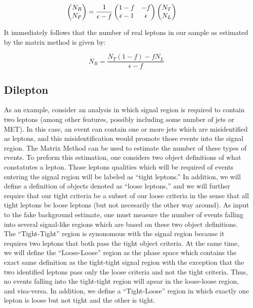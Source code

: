 \begin{equation}
  \label{eqn:single_lepton_matrix_standard_inverted}
  \hspace{-0.5cm}
  \begin{pmatrix}
    N_{R}\\
    N_{F} \\
  \end{pmatrix} 
  = \frac{1}{\epsilon - f}
  \begin{pmatrix}
    1-f & -f \\
    \epsilon-1 & \epsilon \\
  \end{pmatrix}
  \begin{pmatrix}
    N_{T} \\
    N_{L} \\
  \end{pmatrix}
\end{equation}

It immediately follows that the number of real leptons in our sample as estimated by the matrix method is given by:

\begin{equation}
  \label{eqn:single_lepton_matrix_standard_num_real}
  N_{R} = \frac{N_T(1-f) - f N_L}{\epsilon - f}
\end{equation}


\subsection{Dilepton}

As an example, consider an analysis in which signal region is required to contain two leptons (among other features, possibly including some number of jets or MET).
In this case, an event can contain one or more jets which are misidentified as leptons, and this misidentification would promote those events into the signal region.
The Matrix Method can be used to estimate the number of these types of events.
To preform this estimation, one considers two object definitions of what constatutes a lepton.  
Those leptons qualities which will be required of events entering the signal region will be labeled as ``tight leptons.''
In addition, we will define a definition of objects denoted as ``loose leptons,'' and we will further require that our tight criteria be a subset of our loose criteria in the sense that all tight leptons be loose leptons (but not necesarily the other way around).
As input to the fake background estimate, one must measure the number of events falling into several signal-like regions which are based on these two object definitions.
The ``Tight-Tight'' region is synonomous with the signal region because it requires two leptons that both pass the tight object criteria.
At the same time, we will define the ``Loose-Loose'' region as the phase space which contains the exact same definition as the tight-tight signal region with the exception that the two identified leptons pass only the loose criteria and not the tight criteria.
Thus, no events falling into the tight-tight region will apear in the loose-loose region, and visa-versa.
In addition, we define a ``Tight-Loose'' region in which exactly one lepton is loose but not tight and the other is tight.

